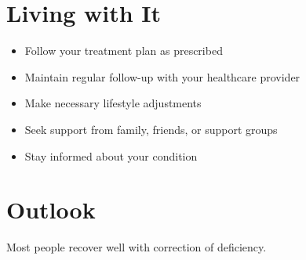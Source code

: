 \section{Living with It}
\begin{itemize}[noitemsep]
  \item Follow your treatment plan as prescribed
  \item Maintain regular follow-up with your healthcare provider
  \item Make necessary lifestyle adjustments
  \item Seek support from family, friends, or support groups
  \item Stay informed about your condition
\end{itemize}
\section{Outlook}
Most people recover well with correction of deficiency.
